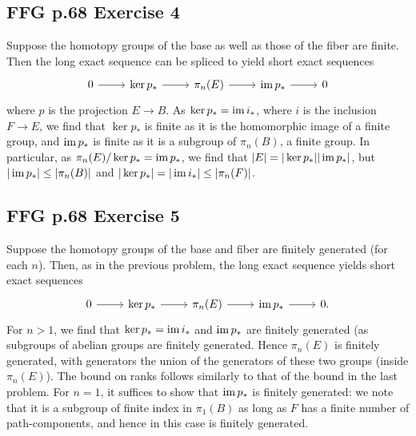 \documentclass{../mathnotes}
\begin{document}
\subsection*{FFG p.68 Exercise 4}
Suppose the homotopy groups of the base as well as those of the fiber are finite. Then
the long exact sequence can be spliced to yield short exact sequences
\begin{equation*}
    \begin{tikzcd}
        0\ar{r} & \ker p_*\ar{r} & \pi_n(E)\ar{r} & \img p_*\ar{r} & 0
    \end{tikzcd}
\end{equation*}
where $p$ is the projection $E\to B$. As $\ker p_*=\operatorname{im} i_*$, where $i$ is the inclusion $F\to E$, we find that
$\ker p_*$ is finite as it is the homomorphic image of a finite group, and $\operatorname{im} p_*$ is finite as it is a subgroup
of $\pi_n(B)$, a finite group. In particular, as $\pi_n(E)/\ker p_*=\operatorname{im} p_*$, we find that $|E|=|\ker p_*||\operatorname{im} p_*|$,
but $|\operatorname{im} p_*|\leq |\pi_n(B)|$ and $|\ker p_*|=|\operatorname{im} i_*|\leq|\pi_n(F)|$.

\subsection*{FFG p.68 Exercise 5}
Suppose the homotopy groups of the base and fiber are finitely generated (for each $n$). Then, as
in the previous problem, the long exact sequence yields short exact sequences 
\begin{equation*}
    \begin{tikzcd}
        0\ar{r} & \ker p_*\ar{r} & \pi_n(E)\ar{r} & \img p_*\ar{r} & 0.
    \end{tikzcd}
\end{equation*}
For $n>1$, we find that $\ker p_*=\operatorname{im} i_*$ and $\operatorname{im} p_*$ are finitely generated (as subgroups of abelian groups
are finitely generated. Hence $\pi_n(E)$ is finitely generated, with generators the union of the generators of these
two groups (inside $\pi_n(E)$). The bound on ranks follows similarly to that of the bound in the last problem.
For $n=1$, it suffices to show that $\operatorname{im} p_*$ is finitely generated: we note that it is a subgroup of finite index
in $\pi_1(B)$ as long as $F$ has a finite number of path-components, and hence in this case is finitely generated.
\end{document}

